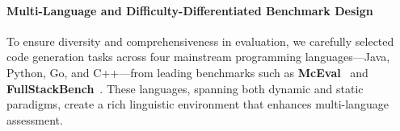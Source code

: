 
\paragraph{Multi-Language and Difficulty-Differentiated Benchmark Design}
To ensure diversity and comprehensiveness in evaluation, we carefully selected code generation tasks across four mainstream programming languages—Java, Python, Go, and C++—from leading benchmarks such as \textbf{McEval}~\cite{mceval} and \textbf{FullStackBench}~\cite{liu2024fullstackbenchevaluatingllms}. These languages, spanning both dynamic and static paradigms, create a rich linguistic environment that enhances multi-language assessment.

